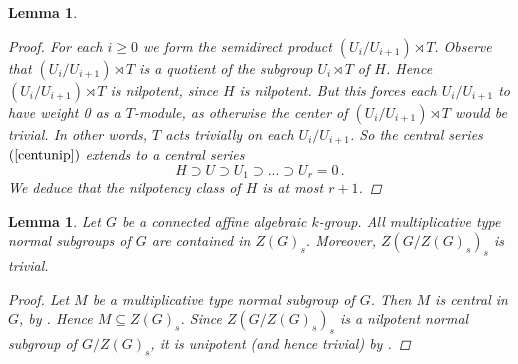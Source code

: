 \documentclass[twoside,a4paper,reqno,11pt]{amsart}
\DeclareMathOperator{\SL}{SL}
\newtheorem{lemma}[theorem]{Lemma}
\theoremstyle{definition}
\begin{document}
\begin{lemma}
\begin{proof}
\vspace{2mm}\noindent For each $i\geq 0$ we form the semidirect product $(U_i/U_{i+1})\rtimes T$. Observe that $(U_i/U_{i+1})\rtimes T$ is a quotient of the subgroup $U_i\rtimes T$ of $H$. Hence $(U_i/U_{i+1})\rtimes T$ is nilpotent, since $H$ is nilpotent. But this forces each $U_i/U_{i+1}$ to have weight 0 as a $T$-module, as otherwise the center of $(U_i/U_{i+1})\rtimes T$ would be trivial. %
In other words, $T$ acts trivially on each $U_i/U_{i+1}$. So the central series $(\ref{centunip})$ extends to a central series \begin{equation}\label{centtrig} H\supset U\supset U_1\supset...\supset U_r=0\,. \end{equation} %
We deduce that the nilpotency class of $H$ is at most $r+1$.
\end{proof}
\end{lemma}

\begin{lemma}\label{largestmulttypenormsubgp} Let $G$ be a connected affine algebraic $k$-group. All multiplicative type normal subgroups of $G$ are contained in $Z(G)_s$. %
Moreover, $Z(G/Z(G)_s)_s$ is trivial.
\begin{proof} Let $M$ be a multiplicative type normal subgroup of $G$. Then $M$ is central in $G$, by \cite[Cor.\ 12.38]{Mi}. Hence $M\subseteq Z(G)_s$. %
Since $Z(G/Z(G)_s)_s$ is a nilpotent normal subgroup of $G/Z(G)_s$, it is unipotent (and hence trivial) by \cite[IV, \S4, Cor.\ 1.13]{DG}. %
\end{proof}
\end{lemma}
\end{document}

